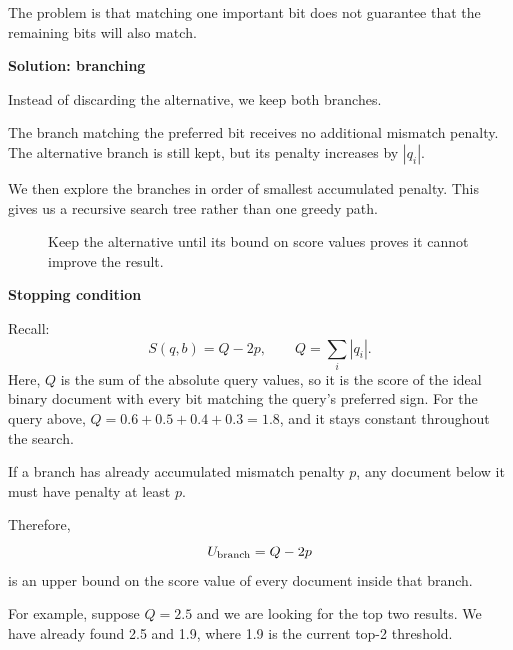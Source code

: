 The problem is that matching one important bit does not guarantee that the remaining bits
will also match.

\textbf{Solution: branching}\par
Instead of discarding the alternative, we keep both branches.

The branch matching the preferred bit receives no additional mismatch penalty. The alternative
branch is still kept, but its penalty increases by $|q_i|$.

We then explore the branches in order of smallest accumulated penalty. This gives us a
recursive search tree rather than one greedy path.

\begin{figure}[H]\centering
{}
\caption{Keep the alternative until its bound on score values proves it cannot improve the result.}
\end{figure}

\textbf{Stopping condition}\par
Recall:
\[
S(q,b)=Q-2p,\qquad Q=\sum_i|q_i|.
\]
Here, $Q$ is the sum of the absolute query values, so it is the score of the ideal binary document with every bit matching the query's preferred sign. For the query above, $Q=0.6+0.5+0.4+0.3=1.8$, and it stays constant throughout the search.

If a branch has already accumulated mismatch penalty $p$, any document below it must have
penalty at least $p$.

Therefore,
\[
U_{\rm branch}=Q-2p
\]
is an upper bound on the score value of every document inside that branch.

For example, suppose $Q=2.5$ and we are looking for the top two results. We have already
found 2.5 and 1.9, where 1.9 is the current top-2 threshold.


